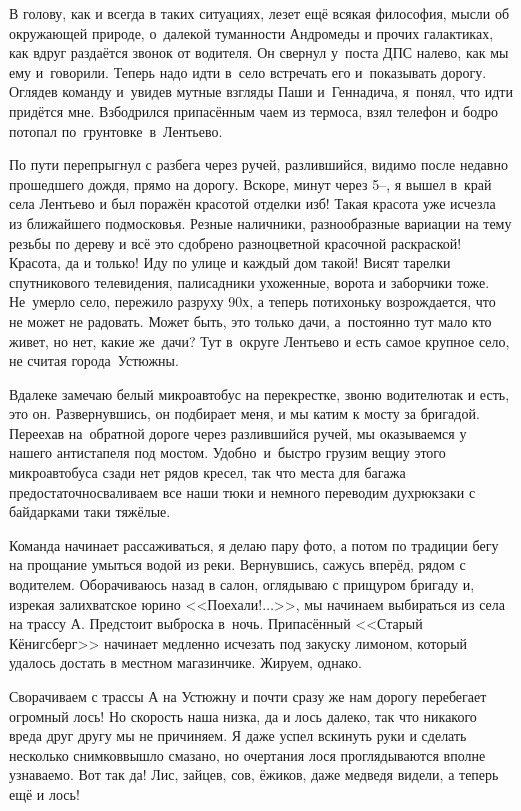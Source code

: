В голову, как и всегда в таких ситуациях, лезет ещё всякая философия, мысли об окружающей природе, о~далекой туманности Андромеды и прочих галактиках, как вдруг раздаётся звонок от водителя. Он свернул у~поста ДПС налево, как мы ему и~говорили. Теперь надо идти в~село встречать его и~показывать дорогу. Оглядев команду и~увидев мутные взгляды Паши и~Геннадича, я~понял, что идти придётся мне. Взбодрился припасённым чаем из термоса, взял телефон и бодро потопал по~грунтовке~в~Лентьево. 
 
По пути перепрыгнул с разбега через ручей, разлившийся, видимо после недавно прошедшего дождя, прямо на дорогу. Вскоре, минут через 5\thinspace\nobreakdash--, я вышел в~край села Лентьево и был поражён красотой отделки изб! Такая красота уже исчезла из ближайшего подмосковья. Резные наличники, разнообразные вариации на тему резьбы по дереву и всё это сдобрено разноцветной красочной раскраской! Красота, да и только! Иду по улице и каждый дом такой! Висят тарелки спутникового телевидения, палисадники ухоженные, ворота и заборчики тоже. Не~умерло село, пережило разруху 90\sdash х, а теперь потихоньку возрождается, что не может не радовать. Может быть, это только дачи, а~постоянно тут мало кто живет, но нет, какие же~дачи? Тут в~округе Лентьево и есть самое крупное село, не считая города~Устюжны.

Вдалеке замечаю белый микроавтобус на перекрестке, звоню водителю\mdash так и есть, это он. Развернувшись, он подбирает меня, и мы катим к мосту за бригадой. Переехав на~обратной дороге через разлившийся ручей, мы оказываемся у нашего антистапеля под мостом. Удобно~и~быстро грузим вещи\mdash у этого микроавтобуса сзади нет рядов кресел, так что места для багажа предостаточно\mdash сваливаем все наши тюки и немного переводим дух\mdash рюкзаки с байдарками таки тяжёлые. 

Команда начинает рассаживаться, я делаю пару фото, а потом по традиции бегу на прощание умыться водой из реки. Вернувшись, сажусь вперёд, рядом с водителем. Оборачиваюсь назад в салон, оглядываю с прищуром бригаду и, изрекая залихватское юрино <<Поехали!$\ldots$>>, мы начинаем выбираться из села на трассу А. Предстоит выброска в~ночь. Припасённый <<Старый Кёнигсберг>> начинает медленно исчезать под закуску лимоном, который удалось достать в местном магазинчике. Жируем, однако.

Сворачиваем с трассы А на Устюжну и почти сразу же нам дорогу перебегает огромный лось! Но скорость наша низка, да и лось далеко, так что никакого вреда друг другу мы не причиняем. Я даже успел вскинуть руки и сделать несколько снимков\mdash вышло смазано, но очертания лося проглядываются вполне узнаваемо. Вот так да! Лис, зайцев, сов, ёжиков, даже медведя видели, а теперь ещё и лось! 

